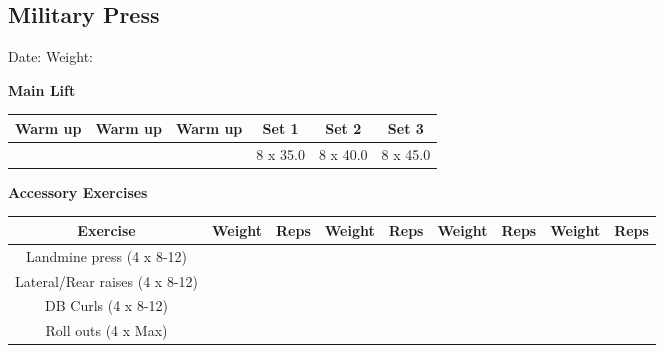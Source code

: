 \documentclass{article}%
\begin{document}
\subsection*{Military Press}%
Date: %
\linebreak%
Weight: %
\vspace*{20pt}%
\linebreak%
\begin{minipage}{0.5\textwidth}%
\textbf{Main Lift\newline%
\newline%
}%
\begin{tabular}{|c|c|c|c|c|c|}%
\hline%
Warm up&Warm up&Warm up&Set 1&Set 2&Set 3\\%
\hline%
&&&8 x 35.0&8 x 40.0&8 x 45.0\\%
\hline%
\end{tabular}%
\vspace*{20pt}%
\linebreak%
\textbf{Accessory Exercises\newline%
\newline%
}%
\begin{tabular}{|c|c|c|c|c|c|c|c|c|}%
\hline%
Exercise&Weight&Reps&Weight&Reps&Weight&Reps&Weight&Reps\\%
\hline%
Landmine press (4 x 8{-}12)&&&&&&&&\\%
\hline%
Lateral/Rear raises (4 x 8{-}12)&&&&&&&&\\%
\hline%
DB Curls (4 x 8{-}12)&&&&&&&&\\%
\hline%
Roll outs (4 x Max)&&&&&&&&\\%
\hline%
\end{tabular}%
\end{minipage}%
\vspace*{20pt}%
\linebreak

%
\end{document}
